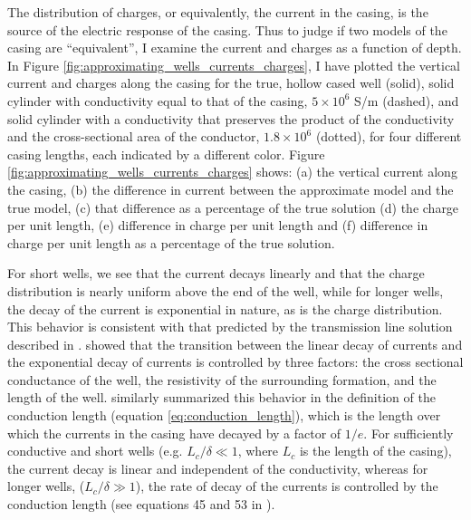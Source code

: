 The distribution of charges, or equivalently, the current in the casing, is the source of the electric response of the casing. Thus to judge if two models of the casing are ``equivalent'', I examine the current and charges as a function of depth. In Figure \ref{fig:approximating_wells_currents_charges}, I have plotted the vertical current and charges along the casing for the true, hollow cased well (solid), solid cylinder with conductivity equal to that of the casing, $5 \times 10^6$ S/m (dashed), and solid cylinder with a conductivity that preserves the product of the conductivity and the cross-sectional area of the conductor, $1.8 \times 10^6$ (dotted), for four different casing lengths, each indicated by a different color. Figure \ref{fig:approximating_wells_currents_charges} shows: (a) the vertical current along the casing, (b) the difference in current between the approximate model and the true model, (c) that difference as a percentage of the true solution (d) the charge per unit length, (e) difference in charge per unit length and (f) difference in charge per unit length as a percentage of the true solution.




For short wells, we see that the current decays linearly and that the charge distribution is nearly uniform above the end of the well, while for longer wells, the decay of the current is exponential in nature, as is the charge distribution. This behavior is consistent with that predicted by the transmission line solution described in \cite{Kaufman1993}. \cite{Kaufman1993} showed that the transition between the linear decay of currents and the exponential decay of currents is controlled by three factors: the cross sectional conductance of the well, the resistivity of the surrounding formation, and the length of the well. \cite{Schenkel1991} similarly summarized this behavior in the definition of the conduction length (equation \ref{eq:conduction_length}), which is the length over which the currents in the casing have decayed by a factor of $1/e$. For sufficiently conductive and short wells (e.g. $L_c / \delta \ll 1$, where $L_c$ is the length of the casing), the current decay is linear and independent of the conductivity, whereas for longer wells, ($L_c / \delta \gg 1$), the rate of decay of the currents is controlled by the conduction length (see equations 45 and 53 in \cite{Kaufman1993}).

